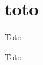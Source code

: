 \documentclass{book}
\begin{document}
\frontmatter
\part{toto}
\begin{pages}
  \begin{Leftside}
    \beginnumbering
     \pstart
     Toto
     \pend
    \endnumbering
  \end{Leftside}

  \begin{Rightside}
    \beginnumbering
     \pstart
     Toto
     \pend
    \endnumbering
  \end{Rightside}
\end{pages}
\Pages[mainmatter]
\end{document}
